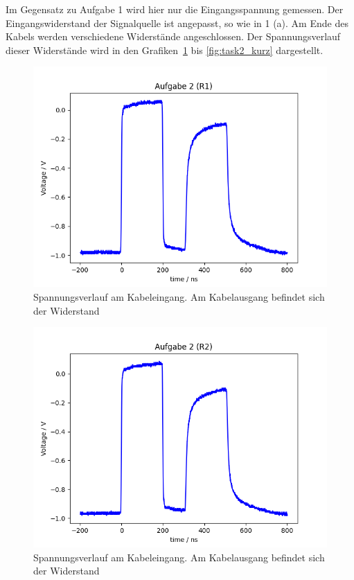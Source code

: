\documentclass{article}
\begin{document}
Im Gegensatz zu Aufgabe 1 wird hier nur die Eingangsspannung gemessen. Der Eingangswiderstand der Signalquelle ist angepasst, so wie in 1 (a). Am Ende des Kabels werden verschiedene Widerstände angeschlossen. Der Spannungsverlauf dieser Widerstände wird in den Grafiken~\ref{fig:task2_R1} bis \ref{fig:task2_kurz} dargestellt.


\begin{figure}[H]
\centering
\caption{Spannungsverlauf am Kabeleingang. Am Kabelausgang befindet sich der Widerstand }
\label{fig:task2_R1}
\includegraphics[scale=0.6]{bilder/task2/task2_R1.png}
\end{figure}



\begin{figure}[H]
\centering
\caption{Spannungsverlauf am Kabeleingang. Am Kabelausgang befindet sich der Widerstand }
\label{fig:task2_R2}
\includegraphics[scale=0.6]{bilder/task2/task2_R2.png}
\end{figure}
\end{document}
